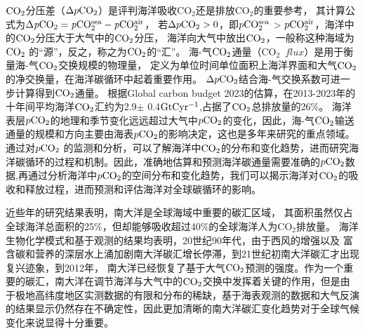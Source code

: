 $\rm CO_2$分压差（$\Delta p\rm CO_2$）是评判海洋吸收$\mathrm{CO_2}$还是排放$\mathrm{CO_2}$的重要参考，
其计算公式为$\Delta \mathit{p}\rm{CO_2} = \mathit{p}\rm{CO_2^{sea}} - \mathit{p}\rm{CO_2^{air}}$，
若$\Delta p \rm{CO_2}>0 $，即$p\rm CO_2^{sea}$ > $p\rm CO_2^{air}$，海洋中的$\rm CO_2$分压大于大气中的$\rm CO_2$分压，
海洋向大气中放出$\rm CO_2$，一般称这种海域为$\rm CO_2$ 的“源”，反之，称之为$\rm CO_2$的“汇”。
海-气$\rm CO_2$通量（$\mathrm{CO_2}$\ $flux$）是用于衡量海-气$\rm CO_2$交换规模的物理量，
定义为单位时间单位面积上海洋界面和大气$\rm CO_2$的净交换量，在海洋碳循环中起着重要作用。 
$\Delta p \rm CO_2$结合海-气交换系数可进一步计算得到$\rm CO_2$通量。
根据Global carbon budget 2023的估算\cite{budget2023global}，在2013-2023年的十年间平均海洋$\rm CO_2$汇约为2.9$\pm$ 0.4$\rm GtC yr^{-1}$,占据了$\rm CO_2$总排放量的26\%\cite{budget2023global}。
海洋表层$p\rm CO_2$的地理和季节变化远远超过大气中$p\rm CO_2$的变化，因此，海-气$\rm CO_2$输送通量的规模和方向主要由海表$p\rm CO_2$的影响决定，这也是多年来研究的重点领域。通过对$p\rm CO_2$ 的监测和分析，可以了解海洋中$\rm CO_2$的分布和变化趋势，进而研究海洋碳循环的过程和机制。因此，准确地估算和预测海洋碳通量需要准确的$p\rm CO_2$数据,再通过分析海洋中$p\rm CO_2$的空间分布和变化趋势，我们可以揭示海洋对$\rm CO_2$的吸收和释放过程，进而预测和评估海洋对全球碳循环的影响。

近些年的研究结果表明\cite{khatiwala2009reconstruction,devries2014oceanic}，南大洋是全球海域中重要的碳汇区域，
其面积虽然仅占全球海洋总面积的25\%，但却能够吸收超过40\%的全球海洋人为$\mathrm{CO_2}$排放量。
海洋生物化学模式和基于观测的结果\cite{hauck2013seasonally}均表明，20世纪90年代，由于西风的增强以及
富含碳和营养的深层水上涌加剧南大洋碳汇增长停滞，到21世纪初南大洋碳汇才出现复兴迹象，到2012年，
南大洋已经恢复了基于大气$\rm CO_2$预测的强度\cite{landschutzer2015reinvigoration}。作为一个重要的碳汇，南大洋在调节海洋与大气中的$\rm CO_2$交换中发挥着关键的作用，但是由于极地高纬度地区实测数据的有限和分布的稀缺，基于海表观测的数据和大气反演的结果显示仍然存在不确定性\cite{Global_Carbon_Budget_2022}，因此更加清晰的南大洋碳汇变化趋势对于全球气候变化来说显得十分重要。

